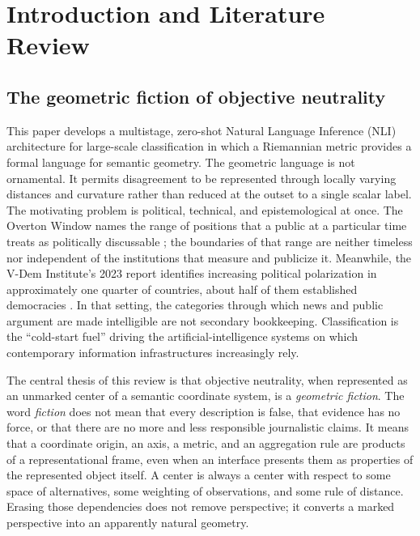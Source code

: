 \section{Introduction and Literature Review}
\label{sec:introduction-literature}

\subsection{The geometric fiction of objective neutrality}

This paper develops a multistage, zero-shot Natural Language Inference (NLI) architecture for large-scale classification in which a Riemannian metric provides a formal language for semantic geometry. The geometric language is not ornamental. It permits disagreement to be represented through locally varying distances and curvature rather than reduced at the outset to a single scalar label. The motivating problem is political, technical, and epistemological at once. The Overton Window names the range of positions that a public at a particular time treats as politically discussable \citep{overton2019}; the boundaries of that range are neither timeless nor independent of the institutions that measure and publicize it. Meanwhile, the V-Dem Institute's 2023 report identifies increasing political polarization in approximately one quarter of countries, about half of them established democracies \citep{vdem2023}. In that setting, the categories through which news and public argument are made intelligible are not secondary bookkeeping. Classification is the ``cold-start fuel'' driving the artificial-intelligence systems on which contemporary information infrastructures increasingly rely.

The central thesis of this review is that objective neutrality, when represented as an unmarked center of a semantic coordinate system, is a \emph{geometric fiction}. The word \emph{fiction} does not mean that every description is false, that evidence has no force, or that there are no more and less responsible journalistic claims. It means that a coordinate origin, an axis, a metric, and an aggregation rule are products of a representational frame, even when an interface presents them as properties of the represented object itself. A center is always a center with respect to some space of alternatives, some weighting of observations, and some rule of distance. Erasing those dependencies does not remove perspective; it converts a marked perspective into an apparently natural geometry.

